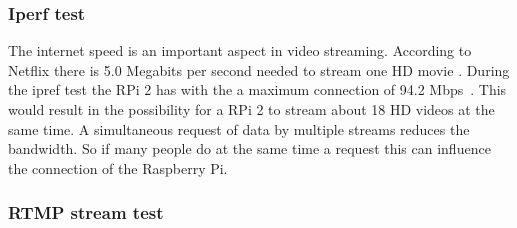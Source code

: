 \documentclass{sig-alternate-br}
\begin{document}
\subsubsection{Iperf test}

The internet speed is an important aspect in video streaming. According to Netflix there is 5.0 Megabits per second needed to stream one HD movie \cite{netflix}. During the ipref test the RPi 2 has with the a maximum connection of  94.2 Mbps~\cite{ipref}. This would result in the possibility for a RPi 2 to stream about 18 HD videos at the same time. A simultaneous request of data by multiple streams reduces the bandwidth. So if many people do at the same time a request this can influence the connection of the Raspberry Pi.  %

\subsubsection{RTMP stream test}
\end{document}
